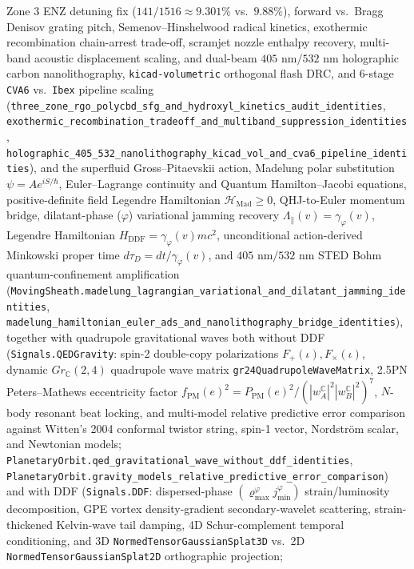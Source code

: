 Zone 3 ENZ detuning fix ($141/1516\approx 9.301\%$ vs.\ $9.88\%$), forward vs.\ Bragg
Denisov grating pitch, Semenov--Hinshelwood radical kinetics, exothermic
recombination chain-arrest trade-off, scramjet nozzle enthalpy recovery,
multi-band acoustic displacement scaling, and dual-beam $405\text{ nm}/532\text{ nm}$
holographic carbon nanolithography, \texttt{kicad-volumetric} orthogonal flash DRC,
and 6-stage \texttt{CVA6} vs.\ \texttt{Ibex} pipeline scaling
(\texttt{three\_zone\_rgo\_polycbd\_sfg\_and\_hydroxyl\_kinetics\_audit\_identities},
\texttt{exothermic\_recombination\_tradeoff\_and\_multiband\_suppression\_identities},
\texttt{holographic\_405\_532\_nanolithography\_kicad\_vol\_and\_cva6\_pipeline\_identities}),
and the superfluid Gross--Pitaevskii action, Madelung polar substitution
$\psi = A e^{i S / \hbar}$, Euler--Lagrange continuity and Quantum Hamilton--Jacobi
equations, positive-definite field Legendre Hamiltonian $\mathcal{H}_{\mathrm{Mad}}\ge 0$,
QHJ-to-Euler momentum bridge, dilatant-phase ($\varphi$) variational jamming recovery
$\Lambda_\parallel(v) = \gamma_\varphi(v)$, Legendre Hamiltonian
$H_{\mathrm{DDF}} = \gamma_\varphi(v) m c^2$, unconditional action-derived
Minkowski proper time $d\tau_D = dt / \gamma_\varphi(v)$, and $405\text{ nm}/532\text{ nm}$
STED Bohm quantum-confinement amplification
(\texttt{MovingSheath.madelung\_lagrangian\_variational\_and\_dilatant\_jamming\_identities},
\texttt{madelung\_hamiltonian\_euler\_ads\_and\_nanolithography\_bridge\_identities}),
together with quadrupole gravitational waves both without DDF (\texttt{Signals.QEDGravity}:
spin-2 double-copy polarizations $F_+(\iota), F_\times(\iota)$, dynamic
$Gr_{\mathbb C}(2,4)$ quadrupole wave matrix \texttt{gr24QuadrupoleWaveMatrix},
2.5PN Peters--Mathews eccentricity factor $f_{\mathrm{PM}}(e)^2 = P_{\mathrm{PM}}(e)^2/(|w_A^{\mathbb C}|^2|w_B^{\mathbb C}|^2)^7$,
$N$-body resonant beat locking, and multi-model relative predictive error comparison
against Witten's 2004 conformal twistor string, spin-1 vector, Nordström scalar,
and Newtonian models;
\texttt{PlanetaryOrbit.qed\_gravitational\_wave\_without\_ddf\_identities},
\texttt{PlanetaryOrbit.gravity\_models\_relative\_predictive\_error\_comparison})
and with DDF (\texttt{Signals.DDF}: dispersed-phase $(\varrho_{\max}^\varphi j_{\min}^\varphi)$
strain/luminosity decomposition, GPE vortex density-gradient secondary-wavelet
scattering, strain-thickened Kelvin-wave tail damping, 4D Schur-complement
temporal conditioning, and 3D \texttt{NormedTensorGaussianSplat3D} vs.\ 2D
\texttt{NormedTensorGaussianSplat2D} orthographic projection;
